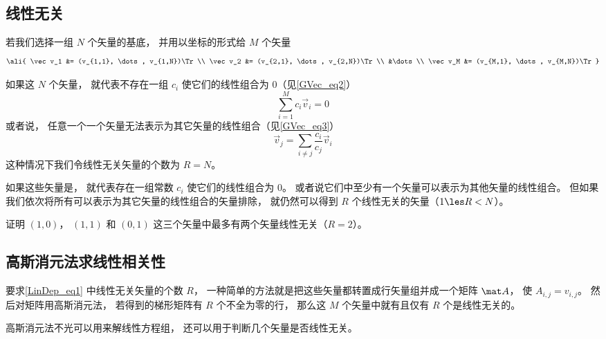 

\subsection{线性无关}

若我们选择一组 $N$ 个矢量的基底， 并用以坐标的形式给 $M$ 个矢量
\begin{equation}\label{LinDep_eq1}
\ali{
\vec v_1 &= (v_{1,1}, \dots, v_{1,N})\Tr \\
\vec v_2 &= (v_{2,1}, \dots, v_{2,N})\Tr \\
&\dots \\
\vec v_M &= (v_{M,1}, \dots, v_{M,N})\Tr
}\end{equation}

如果这 $N$ 个矢量， 就代表不存在一组 $c_i$ 使它们的线性组合为 0（见\autoref{GVec_eq2}）
\begin{equation}
\sum_{i=1}^M c_i\vec v_i = 0
\end{equation}
或者说， 任意一个一个矢量无法表示为其它矢量的线性组合（见\autoref{GVec_eq3}）%
\begin{equation}
\vec v_j = \sum_{i \ne j}\frac{c_i}{c_j} \vec v_i
\end{equation}
这种情况下我们令线性无关矢量的个数为 $R = N$。

如果这些矢量是， 就代表存在一组常数 $c_i$ 使它们的线性组合为 0。 或者说它们中至少有一个矢量可以表示为其他矢量的线性组合。 但如果我们依次将所有可以表示为其它矢量的线性组合的矢量排除， 就仍然可以得到  $R$ 个线性无关的矢量（$1 \les R < N$）。

\begin{exer}{}
证明 $(1,0)$， $(1,1)$ 和 $(0,1)$ 这三个矢量中最多有两个矢量线性无关（$R = 2$）。
\end{exer}

\subsection{高斯消元法求线性相关性}
要求\autoref{LinDep_eq1} 中线性无关矢量的个数 $R$， 一种简单的方法就是把这些矢量都转置成行矢量组并成一个矩阵 $\mat A$， 使 $A_{i,j} = v_{i,j}$。 然后对矩阵用高斯消元法， 若得到的梯形矩阵有 $R$ 个不全为零的行， 那么这 $M$ 个矢量中就有且仅有 $R$ 个是线性无关的。












高斯消元法不光可以用来解线性方程组， 还可以用于判断几个矢量是否线性无关。 